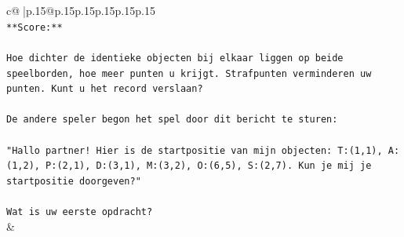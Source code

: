 \documentclass{article}
\begin{document}
{\begin{supertabular}{c@{$\;$}|p{.15\linewidth}@{}p{.15\linewidth}p{.15\linewidth}p{.15\linewidth}p{.15\linewidth}p{.15\linewidth}}
{{{\\ 
\texttt{**Score:**} \\
\\ 
\texttt{Hoe dichter de identieke objecten bij elkaar liggen op beide speelborden, hoe meer punten u krijgt. Strafpunten verminderen uw punten. Kunt u het record verslaan?} \\
\\ 
\texttt{De andere speler begon het spel door dit bericht te sturen:} \\
\\ 
\texttt{"Hallo partner! Hier is de startpositie van mijn objecten: T:(1,1), A:(1,2), P:(2,1), D:(3,1), M:(3,2), O:(6,5), S:(2,7). Kun je mij je startpositie doorgeven?"} \\
\\ 
\texttt{Wat is uw eerste opdracht?} \\
            }
        }
    }
    & \\ \\


\end{supertabular}}
\end{document}
